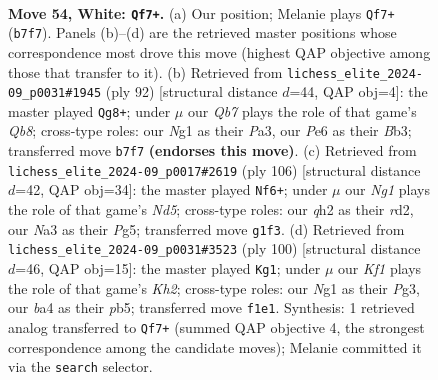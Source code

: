 \documentclass[11pt]{article}
\begin{document}
\clearpage

\begin{figure}[p]\centering
\begin{subfigure}{0.46\textwidth}\centering
\resizebox{\linewidth}{!}{%
\newchessgame
\chessboard[
  setfen={4n1k1/1Q6/p3P3/3P1p1p/b5p1/N7/5P1q/5KN1 w - - 3 54},
  showmover=false,
  pgfstyle=straightmove, color=movearrow, markmove={b7-f7}
]}
\caption{}
\end{subfigure}\hfill
\begin{subfigure}{0.46\textwidth}\centering
\resizebox{\linewidth}{!}{%
\newchessgame
\chessboard[
  setfen={1Q6/3bq1k1/p7/1p6/4P1p1/PB5p/1P6/K7 w - - 0 47},
  showmover=false,
  pgfstyle=straightmove, color=movearrow, markmove={b8-g8}
]}
\caption{}
\end{subfigure}
\\[4pt]
\begin{subfigure}{0.46\textwidth}\centering
\resizebox{\linewidth}{!}{%
\newchessgame
\chessboard[
  setfen={6k1/1Q6/p2q2p1/3N1pP1/8/1P4PK/3r4/8 w - - 8 54},
  showmover=false,
  pgfstyle=straightmove, color=movearrow, markmove={d5-f6}
]}
\caption{}
\end{subfigure}\hfill
\begin{subfigure}{0.46\textwidth}\centering
\resizebox{\linewidth}{!}{%
\newchessgame
\chessboard[
  setfen={6k1/6p1/p2Q3p/Pp6/8/5qPP/5P1K/8 w - - 3 51},
  showmover=false,
  pgfstyle=straightmove, color=movearrow, markmove={h2-g1}
]}
\caption{}
\end{subfigure}
\caption{\textbf{Move 54, White: \texttt{Qf7+}.} (a) Our position; Melanie plays \texttt{Qf7+} (\texttt{b7f7}). Panels (b)--(d) are the retrieved master positions whose correspondence most drove this move (highest QAP objective among those that transfer to it). (b) Retrieved from \texttt{lichess\_elite\_2024-09\_p0031\#1945} (ply 92) [structural distance $d$=44, QAP obj=4]: the master played \texttt{Qg8+}; under $\mu$ our \emph{Qb7} plays the role of that game's \emph{Qb8}; cross-type roles: our \emph{N}g1 as their \emph{P}a3, our \emph{P}e6 as their \emph{B}b3; transferred move \texttt{b7f7} \textbf{(endorses this move)}. (c) Retrieved from \texttt{lichess\_elite\_2024-09\_p0017\#2619} (ply 106) [structural distance $d$=42, QAP obj=34]: the master played \texttt{Nf6+}; under $\mu$ our \emph{Ng1} plays the role of that game's \emph{Nd5}; cross-type roles: our \emph{q}h2 as their \emph{r}d2, our \emph{N}a3 as their \emph{P}g5; transferred move \texttt{g1f3}. (d) Retrieved from \texttt{lichess\_elite\_2024-09\_p0031\#3523} (ply 100) [structural distance $d$=46, QAP obj=15]: the master played \texttt{Kg1}; under $\mu$ our \emph{Kf1} plays the role of that game's \emph{Kh2}; cross-type roles: our \emph{N}g1 as their \emph{P}g3, our \emph{b}a4 as their \emph{p}b5; transferred move \texttt{f1e1}. Synthesis: 1 retrieved analog transferred to \texttt{Qf7+} (summed QAP objective 4, the strongest correspondence among the candidate moves); Melanie committed it via the \texttt{search} selector.}
\label{fig:thought-m106}
\end{figure}
\end{document}
